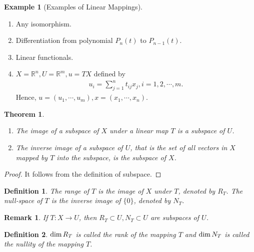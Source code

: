 \documentclass[11pt]{book}
\newtheorem{definition}{Definition}[chapter]
\newtheorem{theorem}{Theorem}[chapter]
\newtheorem{remark}{Remark}[chapter]
\theoremstyle{definition}
\newtheorem{example}{Example}[chapter]
\numberwithin{equation}{chapter}
\begin{document}
\medskip

\begin{example}[Examples of Linear Mappings]
~\begin{enumerate}[label=(\arabic*)]
    \item Any isomorphism.
    \item Differentiation from polynomial $P_n(t)$ to $P_{n-1}(t)$.
    \item Linear functionals.
    \item $X=\mathbb{R}^n, U=\mathbb{R}^m, u = TX$ defined by
    \begin{align*}
        u_i = \sum^n_{j=1}t_{ij}x_j, i = 1,2,\cdots,m.
    \end{align*}
    Hence, $u = (u_1,\cdots,u_m), x = (x_1,\cdots,x_n)$.
\end{enumerate}
\end{example}

\medskip

\begin{theorem}
~\begin{enumerate}[label=(\alph*)]
    \item The image of a subspace of $X$ under a linear map $T$ is a subspace of $U$.
    \item The inverse image of a subspace of $U$, that is the set of all vectors in $X$ mapped by $T$ into the subspace, is the subspace of $X$.
\end{enumerate}
\end{theorem}
\begin{proof}
It follows from the definition of subspace.
\end{proof}

\medskip

\begin{definition}
The range of $T$ is the image of $X$ under $T$, denoted by $R_T$. The null-space of $T$ is the inverse image of $\{0\}$, denoted by $N_T$.
\end{definition}
\begin{remark}
If $T:X\to U$, then $R_T\subset U, N_T\subset U$ are subspaces of $U$.
\end{remark}

\medskip

\begin{definition}
${\rm dim}\,R_T$ is called the rank of the mapping $T$ and ${\rm dim}\,N_T$ is called the nullity of the mapping $T$.
\end{definition}

\medskip
\end{document}
